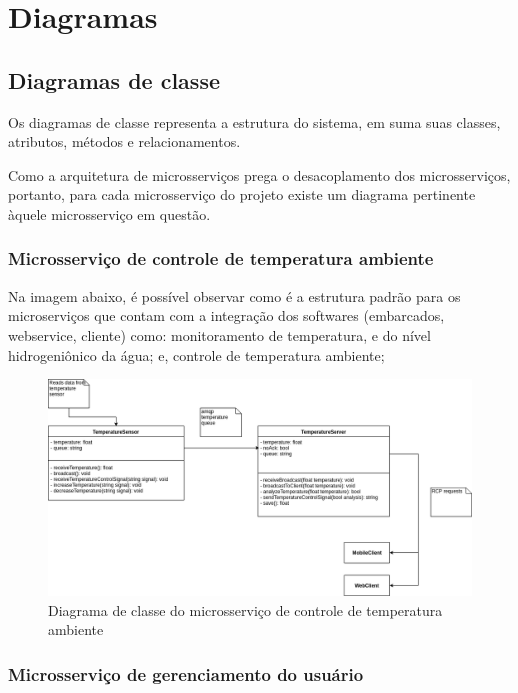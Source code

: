 \section{Diagramas}

\subsection{Diagramas de classe}

Os diagramas de classe representa a estrutura do sistema, em suma suas classes, atributos, métodos e relacionamentos. \cite{ibm}

Como a arquitetura de microsserviços prega o desacoplamento dos microsserviços, portanto, para cada microsserviço do projeto existe um diagrama pertinente àquele microsserviço em questão.

\subsubsection{Microsserviço de controle de temperatura ambiente}

Na imagem abaixo, é possível observar como é a estrutura padrão para os microserviços que contam com a integração dos softwares (embarcados, webservice, cliente) como: monitoramento de temperatura, e do nível hidrogeniônico da água; e, controle de temperatura ambiente;

\begin{figure}[H]
	\centering
	\includegraphics[width=17cm]{figuras/microservico_temperatura.png}
	\caption{Diagrama de classe do microsserviço de controle de temperatura ambiente} \label{microservico_temperatura}
\end{figure}

\subsubsection{Microsserviço de gerenciamento do usuário}

